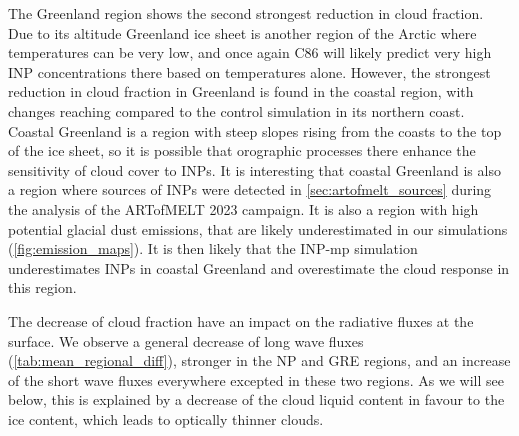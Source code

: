     The Greenland region shows the second strongest reduction in cloud fraction.
    Due to its altitude Greenland ice sheet is another region of the Arctic where temperatures can be very low, and once again C86 will likely predict very high INP concentrations there based on temperatures alone.
    However, the strongest reduction in cloud fraction in Greenland is found in the coastal region, with changes reaching  compared to the control simulation in its northern coast. Coastal Greenland is a region with steep slopes rising from the coasts to the top of the ice sheet, so it is possible that orographic processes there enhance the sensitivity of cloud cover to INPs.
    It is interesting that coastal Greenland is also a region where sources of INPs were detected in \cref{sec:artofmelt_sources} during the analysis of the ARTofMELT 2023 campaign. It is also a region with high potential glacial dust emissions, that are likely underestimated in our simulations (\cref{fig:emission_maps}). It is then likely that the INP-mp simulation underestimates INPs in coastal Greenland and overestimate the cloud response in this region.


    \vspace{\baselineskip}
    The decrease of cloud fraction have an impact on the radiative fluxes at the surface. 
    We observe a general decrease of long wave fluxes (\cref{tab:mean_regional_diff}), stronger in the NP and GRE regions, and an increase of the short wave fluxes everywhere excepted in these two regions.
    As we will see below, this is explained by a decrease of the cloud liquid content in favour to the ice content, which leads to optically thinner clouds.

    \vspace{\baselineskip}
